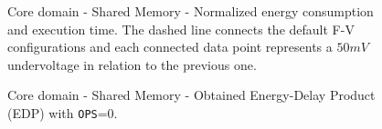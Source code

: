 \begin{figure}[!htb]
    \centering
    \begin{subfigmatrix}{2}
      \label{fig:sm_behaviour}
    \end{subfigmatrix}
    \caption{Core domain - Shared Memory - Normalized energy consumption and execution time. The dashed line connects the default F-V configurations and each connected data point represents a $50mV$ undervoltage in relation to the previous one.}
\end{figure}

\begin{figure}[!htb]
    \centering
    \begin{subfigmatrix}{2}
      \label{fig:sm_edp}
    \end{subfigmatrix}
    \caption{Core domain - Shared Memory - Obtained Energy-Delay Product (EDP) with \texttt{OPS}=0.}
\end{figure}



